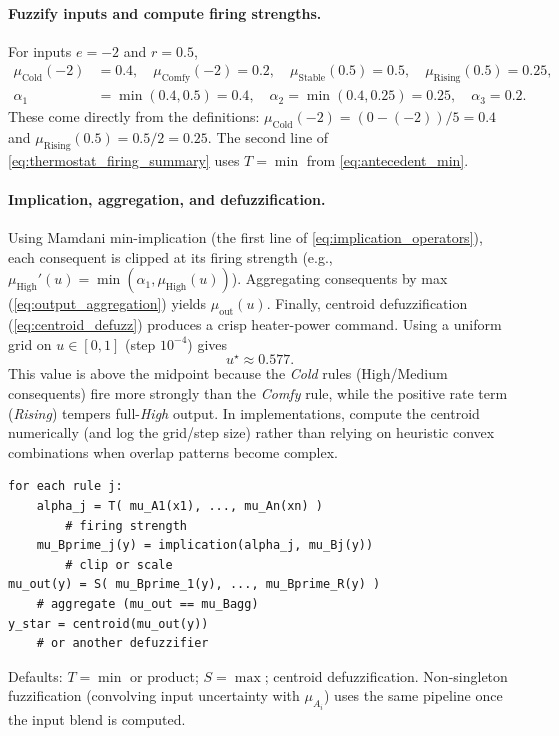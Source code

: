 \paragraph{Fuzzify inputs and compute firing strengths.}
For inputs \(e=-2\) and \(r=0.5\),
\begin{equation}
\begin{aligned}
\mu_{\text{Cold}}(-2)&=0.4,\quad
\mu_{\text{Comfy}}(-2)=0.2,\quad
\mu_{\text{Stable}}(0.5)=0.5,\quad
\mu_{\text{Rising}}(0.5)=0.25,\\
\alpha_1&=\min(0.4,0.5)=0.4,\quad
\alpha_2=\min(0.4,0.25)=0.25,\quad
\alpha_3=0.2.
\end{aligned}
\label{eq:thermostat_firing_summary}
\end{equation}
These come directly from the definitions: \(\mu_{\text{Cold}}(-2)=(0-(-2))/5=0.4\) and \(\mu_{\text{Rising}}(0.5)=0.5/2=0.25\). The second line of \eqref{eq:thermostat_firing_summary} uses \(T=\min\) from \eqref{eq:antecedent_min}.

\paragraph{Implication, aggregation, and defuzzification.}
Using Mamdani min-implication (the first line of \eqref{eq:implication_operators}), each consequent is clipped at its firing strength (e.g., \(\mu_{\text{High}}'(u)=\min(\alpha_1,\mu_{\text{High}}(u))\)). Aggregating consequents by max (\eqref{eq:output_aggregation}) yields \(\mu_{\text{out}}(u)\).
Finally, centroid defuzzification (\eqref{eq:centroid_defuzz}) produces a crisp heater-power command. Using a uniform grid on \(u \in [0,1]\) (step \(10^{-4}\)) gives
\begin{equation}
u^\star \approx 0.577.
\label{eq:thermostat_centroid_result}
\end{equation}
This value is above the midpoint because the \textit{Cold} rules (High/Medium consequents) fire more strongly than the \textit{Comfy} rule, while the positive rate term (\textit{Rising}) tempers full-\textit{High} output.
In implementations, compute the centroid numerically (and log the grid/step size) rather than relying on heuristic convex combinations when overlap patterns become complex.

\vspace*{1.2\baselineskip}
\noindent
\begin{tcolorbox}[summarybox, title={Pipeline at a glance (Mamdani/Larsen)}]
\begin{verbatim}
for each rule j:
    alpha_j = T( mu_A1(x1), ..., mu_An(xn) )
        # firing strength
    mu_Bprime_j(y) = implication(alpha_j, mu_Bj(y))
        # clip or scale
mu_out(y) = S( mu_Bprime_1(y), ..., mu_Bprime_R(y) )
    # aggregate (mu_out == mu_Bagg)
y_star = centroid(mu_out(y))
    # or another defuzzifier
\end{verbatim}
Defaults: \(T=\min\) or product; \(S=\max\); centroid defuzzification. Non-singleton fuzzification (convolving input uncertainty with \(\mu_{A_i}\)) uses the same pipeline once the input blend is computed.
\end{tcolorbox}

